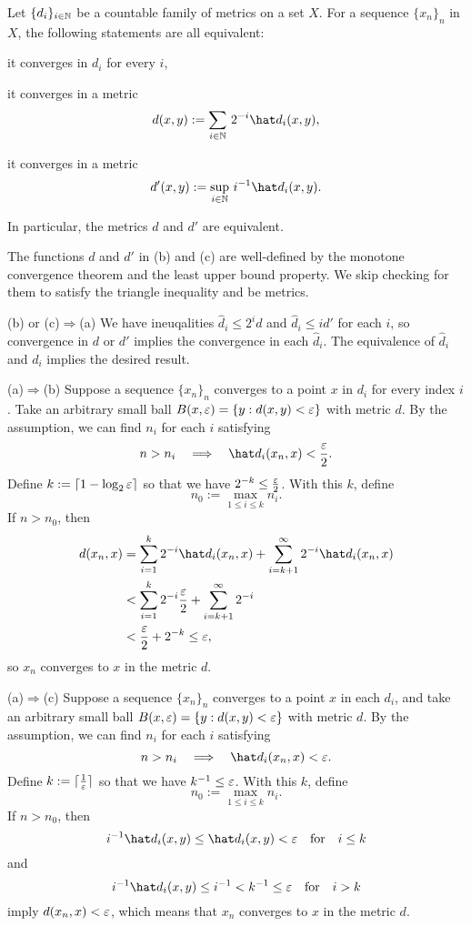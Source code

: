 \documentclass{../note}
\begin{document}
\begin{prop}
Let $\{d_i\}_{i\in\mathbb{N}}$ be a countable family of metrics on a set $X$.
For a sequence $\{x_n\}_n$ in $X$, the following statements are all equivalent:
\begin{parts}
\item it converges in $d_i$ for every $i$,
\item it converges in a metric
\[d(x,y):=\sum_{i\in\N}\,2^{-i}\hat d_i(x,y),\]
\item it converges in a metric
\[d'(x,y):=\sup_{i\in\N}\,i^{-1}\hat d_i(x,y).\]
\end{parts}
In particular, the metrics $d$ and $d'$ are equivalent.
\end{prop}
\begin{pf}
The functions $d$ and $d'$ in (b) and (c) are well-defined by the monotone convergence theorem and the least upper bound property.
We skip checking for them to satisfy the triangle inequality and be metrics.

(b) or (c)$\Rightarrow$(a)
We have ineuqalities $\hat d_i\le2^id$ and $\hat d_i\le id'$ for each $i$, so convergence in $d$ or $d'$ implies the convergence in each $\hat d_i$.
The equivalence of $\hat d_i$ and $d_i$ implies the desired result.

(a)$\Rightarrow$(b)
Suppose a sequence $\{x_n\}_n$ converges to a point $x$ in $d_i$ for every index $i$.
Take an arbitrary small ball $B(x,\varepsilon)=\{y:d(x,y)<\varepsilon\}$ with metric $d$.
By the assumption, we can find $n_i$ for each $i$ satisfying
\[n>n_i\impl\hat d_i(x_n,x)<\frac\e2.\]
Define $k:=\lceil1-\log_2\varepsilon\rceil$ so that we have $2^{-k}\le\frac{\varepsilon}2$.
With this $k$, define
\[n_0:=\max_{1\le i\le k}n_i.\]
If $n>n_0$, then
\begin{align*}
d(x_n,x)&=\sum_{i=1}^k2^{-i}\hat d_i(x_n,x)+\sum_{i=k+1}^\infty2^{-i}\hat d_i(x_n,x)\\
&<\sum_{i=1}^k2^{-i}\frac\e2+\sum_{i=k+1}^\infty2^{-i}\\
&<\frac\e2+2^{-k}\le\e,
\end{align*}
so $x_n$ converges to $x$ in the metric $d$.

(a)$\Rightarrow$(c)
Suppose a sequence $\{x_n\}_n$ converges to a point $x$ in each $d_i$, and take an arbitrary small ball $B(x,\varepsilon)=\{y:d(x,y)<\varepsilon\}$ with metric $d$.
By the assumption, we can find $n_i$ for each $i$ satisfying
\[n>n_i\impl\hat d_i(x_n,x)<\e.\]
Define $k:=\lceil\frac1{\varepsilon}\rceil$ so that we have $k^{-1}\le\varepsilon$.
With this $k$, define
\[n_0:=\max_{1\le i\le k}n_i.\]
If $n>n_0$, then
\[i^{-1}\hat d_i(x,y)\le\hat d_i(x,y)<\e\quad\text{for}\quad i\le k\]
and
\[i^{-1}\hat d_i(x,y)\le i^{-1}<k^{-1}\le\e\quad\text{for}\quad i>k\]
imply $d(x_n,x)<\varepsilon$, which means that $x_n$ converges to $x$ in the metric $d$.
\end{pf}
\end{document}

